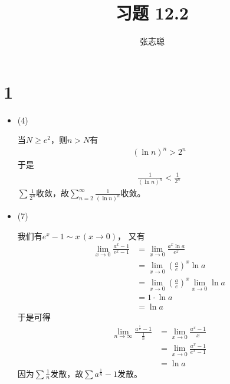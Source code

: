 \documentclass{article}
\begin{document}
\title{习题 12.2}
\author{张志聪}
\maketitle

\section*{1}

\begin{itemize}
  \item (4)

        当$N \geq e^2$，则$n > N$有
        \begin{align*}
          (\ln n)^n > 2^n
        \end{align*}
        于是
        \begin{align*}
          \frac{1}{(\ln n)^n} < \frac{1}{2^n}
        \end{align*}
        $\sum \frac{1}{2^n}$收敛，故$\sum\limits_{n = 2}^{\infty} \frac{1}{(\ln n)^n}$收敛。

  \item (7)

        我们有$e^x - 1 \sim x \, (x \to 0)$，
        又有
        \begin{align*}
          \lim\limits_{x \to 0} \frac{a^x -1}{e^x - 1}
           & = \lim\limits_{x \to 0} \frac{a^x \ln a}{e^x}                       \\
           & = \lim\limits_{x \to 0} (\frac{a}{e})^x \ln a                       \\
           & = \lim\limits_{x \to 0} (\frac{a}{e})^x \lim\limits_{x \to 0} \ln a \\
           & = 1 \cdot \ln a                                                     \\
           & = \ln a
        \end{align*}
        于是可得
        \begin{align*}
          \lim\limits_{n \to \infty} \frac{a^{\frac{1}{n}} -1}{\frac{1}{n}}
           & = \lim\limits_{x \to 0} \frac{a^{x} -1}{x}       \\
           & = \lim\limits_{x \to 0} \frac{a^{x} -1}{e^x - 1} \\
           & = \ln a
        \end{align*}
        因为$\sum \frac{1}{n}$发散，故$\sum a^{\frac{1}{n}} -1 $发散。


\end{itemize}
\end{document}
